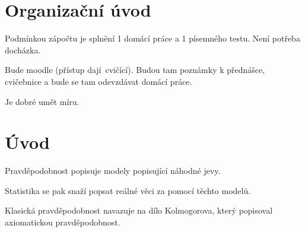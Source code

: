 \documentclass[12pt]{article}					%
\begin{document}
\section*{Organizační úvod}
\begin{poznamka}
	Podmínkou zápočtu je splnění 1 domácí práce a 1 písemného testu. Není potřeba docházka.

	Bude moodle (přístup dají cvičící). Budou tam poznámky k přednášce, cvičebnice a bude se tam odevzdávat domácí práce.

	Je dobré umět míru.
\end{poznamka}

\section{Úvod}
\begin{poznamka}
	Pravděpodobnost popisuje modely popisující náhodné jevy.

	Statistika se pak snaží popsat reálné věci za pomocí těchto modelů.
\end{poznamka}

\begin{poznamka}[Historie]
	Klasická pravděpodobnost navazuje na dílo Kolmogorova, který popisoval axiomatickou pravděpodobnost.
\end{poznamka}
\end{document}
